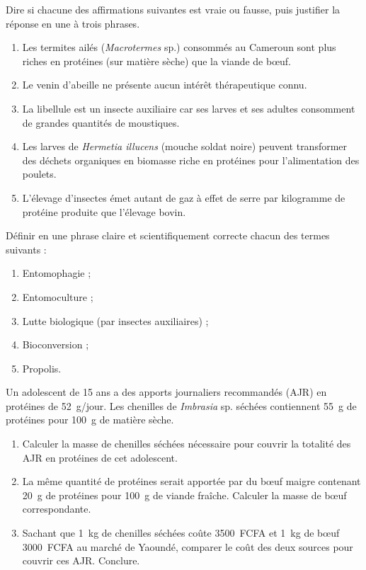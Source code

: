 \documentclass[11pt]{article}
\begin{document}
\begin{exercice}
Dire si chacune des affirmations suivantes est vraie ou fausse, puis justifier la réponse en une à trois phrases.
\begin{enumerate}
\item Les termites ailés (\emph{Macrotermes} sp.) consommés au Cameroun sont plus riches en protéines (sur matière sèche) que la viande de bœuf.
\item Le venin d'abeille ne présente aucun intérêt thérapeutique connu.
\item La libellule est un insecte auxiliaire car ses larves et ses adultes consomment de grandes quantités de moustiques.
\item Les larves de \emph{Hermetia illucens} (mouche soldat noire) peuvent transformer des déchets organiques en biomasse riche en protéines pour l'alimentation des poulets.
\item L'élevage d'insectes émet autant de gaz à effet de serre par kilogramme de protéine produite que l'élevage bovin.
\end{enumerate}
\end{exercice}

\begin{exercice}[Définitions]
Définir en une phrase claire et scientifiquement correcte chacun des termes suivants :
\begin{enumerate}
\item Entomophagie ;
\item Entomoculture ;
\item Lutte biologique (par insectes auxiliaires) ;
\item Bioconversion ;
\item Propolis.
\end{enumerate}
\end{exercice}

\begin{exercice}
Un adolescent de 15 ans a des apports journaliers recommandés (AJR) en protéines de \SI{52}{g/jour}. Les chenilles de \emph{Imbrasia} sp. séchées contiennent \SI{55}{g} de protéines pour \SI{100}{g} de matière sèche.
\begin{enumerate}
\item Calculer la masse de chenilles séchées nécessaire pour couvrir la totalité des AJR en protéines de cet adolescent.
\item La même quantité de protéines serait apportée par du bœuf maigre contenant \SI{20}{g} de protéines pour \SI{100}{g} de viande fraîche. Calculer la masse de bœuf correspondante.
\item Sachant que \SI{1}{kg} de chenilles séchées coûte \SI{3500}{FCFA} et \SI{1}{kg} de bœuf \SI{3000}{FCFA} au marché de Yaoundé, comparer le coût des deux sources pour couvrir ces AJR. Conclure.
\end{enumerate}
\end{exercice}
\end{document}
